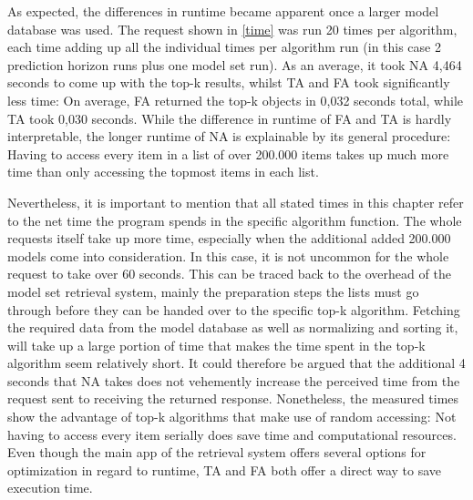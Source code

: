As expected, the differences in runtime became apparent once a larger model database was used. The request shown in \autoref{time} was run 20 times per algorithm, each time adding up all the individual times per algorithm run (in this case 2 prediction horizon runs plus one model set run). As an average, it took NA 4,464 seconds to come up with the top-k results, whilst TA and FA took significantly less time: On average, FA returned the top-k objects in 0,032 seconds total, while TA took 0,030 seconds. While the difference in runtime of FA and TA is hardly interpretable, the longer runtime of NA is explainable by its general procedure: Having to access every item in a list of over 200.000 items takes up much more time than only accessing the topmost items in each list. 


Nevertheless, it is important to mention that all stated times in this chapter refer to the net time the program spends in the specific algorithm function. The whole requests itself take up more time, especially when the additional added 200.000 models come into consideration. In this case, it is not uncommon for the whole request to take over 60 seconds. This can be traced back to the overhead of the model set retrieval system, mainly the preparation steps the lists must go through before they can be handed over to the specific top-k algorithm. Fetching the required data from the model database as well as normalizing and sorting it, will take up a large portion of time that makes the time spent in the top-k algorithm seem relatively short. It could therefore be argued that the additional 4 seconds that NA takes does not vehemently increase the perceived time from the request sent to receiving the returned response. Nonetheless, the measured times show the advantage of top-k algorithms that make use of random accessing: Not having to access every item serially does save time and computational resources. Even though the main app of the retrieval system offers several options for optimization in regard to runtime, TA and FA both offer a direct way to save execution time. 

